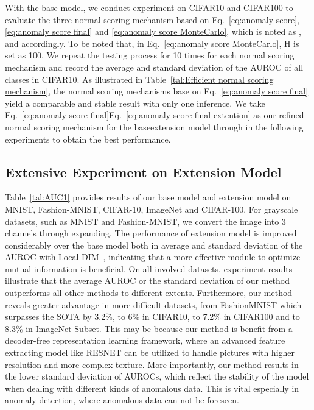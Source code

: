 \documentclass[journal]{IEEEtran}
\theoremstyle{remark}
\begin{document}
With the base model, we conduct experiment on CIFAR10 and CIFAR100 to evaluate the three normal scoring mechanism based on Eq.~\ref{eq:anomaly score}, \ref{eq:anomaly score final} and \ref{eq:anomaly score MonteCarlo}, which is noted as  ,  and  accordingly. To be noted that, in Eq.~\ref{eq:anomaly score MonteCarlo}, H is set as 100. We repeat the testing process for 10 times for each normal scoring mechanism and record the average and standard deviation of the AUROC of all classes in CIFAR10. As illustrated in Table~\ref{tal:Efficient normal scoring mechanism}, the normal scoring mechanisms base on Eq.~\ref{eq:anomaly score final} yield a comparable and stable result with only one inference. We take Eq.~\ref{eq:anomaly score final}Eq.~\ref{eq:anomaly score final extention} as our refined normal scoring mechanism for the baseextension model through in the following experiments to obtain the best performance.


\subsection{Extensive Experiment on Extension Model}\label{sec:Extensive Experiment}

Table~\ref{tal:AUC1} provides results of our base model and extension model on MNIST, Fashion-MNIST, CIFAR-10, ImageNet and CIFAR-100. For grayscale datasets, such as MNIST and Fashion-MNIST, we convert the image into 3 channels through expanding.
The performance of extension model is improved considerably over the base model both in average and standard deviation of the AUROC with Local DIM~\cite{AMDIM}, indicating that a more effective module to optimize mutual information is beneficial.
On all involved datasets, experiment results illustrate that the average AUROC or the standard deviation of our method outperforms all other methods to different extents. Furthermore, our method reveals greater advantage in more difficult datasets, from FashionMNIST which surpasses the SOTA by 3.2\%, to 6\% in CIFAR10, to 7.2\% in CIFAR100 and to 8.3\% in ImageNet Subset. This may be because our method is benefit from a decoder-free representation learning framework, where an advanced feature extracting model like RESNET can be utilized to handle pictures with higher resolution and more complex texture.
More importantly, our method results in the lower standard deviation of AUROCs, which reflect the stability of the model when dealing with different kinds of anomalous data. This is vital especially in anomaly detection, where anomalous data can not be foreseen\cite{fye2020ARNet}. 
\end{document}
